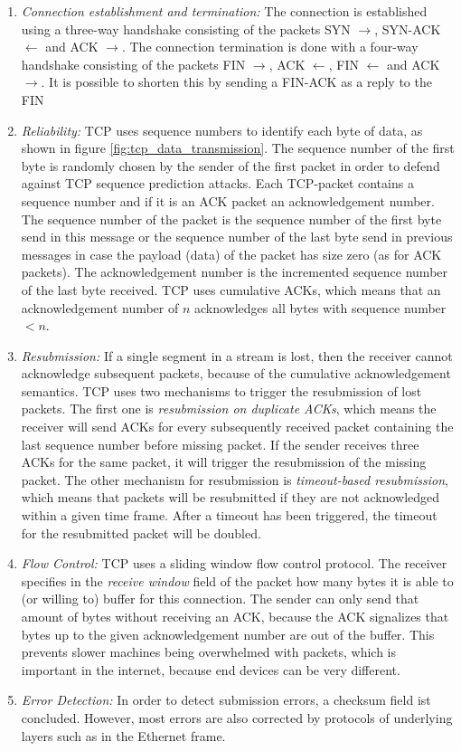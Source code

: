 \begin{enumerate}
      \item \textit{Connection establishment and termination:} The connection is established using a three-way handshake consisting of the packets SYN $\rightarrow$, SYN-ACK $\leftarrow$ and ACK $\rightarrow$. The connection termination is done with a four-way handshake consisting of the packets FIN $\rightarrow$, ACK $\leftarrow$, FIN $\leftarrow$ and ACK $\rightarrow$. It is possible to shorten this by sending a FIN-ACK as a reply to the FIN
      \item \textit{Reliability:} \ac{TCP} uses sequence numbers to identify each byte of data, as shown in figure \ref{fig:tcp_data_transmission}. The sequence number of the first byte is randomly chosen by the sender of the first packet in order to defend against TCP sequence prediction attacks. Each \ac{TCP}-packet contains a sequence number and \textendash{} if it is an ACK packet \textendash{} an acknowledgement number. The sequence number of the packet is the sequence number of the first byte send in this message or the sequence number of the last byte send in previous messages in case the payload (data) of the packet has size zero (as for ACK packets). The acknowledgement number is the incremented sequence number of the last byte received. TCP uses cumulative ACKs, which means that an acknowledgement number of $n$ acknowledges all bytes with sequence number $< n$.
      \item \textit{Resubmission:} If a single segment in a stream is lost, then the receiver cannot acknowledge subsequent packets, because of the cumulative acknowledgement semantics. TCP uses two mechanisms to trigger the resubmission of lost packets. The first one is \textit{resubmission on duplicate ACKs}, which means the receiver will send ACKs for every subsequently received packet containing the last sequence number before missing packet. If the sender receives three ACKs for the same packet, it will trigger the resubmission of the missing packet. The other mechanism for resubmission is \textit{timeout-based resubmission}, which means that packets will be resubmitted if they are not acknowledged within a given time frame. After a timeout has been triggered, the timeout for the resubmitted packet will be doubled.
      \item \textit{Flow Control:} \ac{TCP} uses a sliding window flow control protocol. The receiver specifies in the \textit{receive window} field of the packet how many bytes it is able to (or willing to) buffer for this connection. The sender can only send that amount of bytes without receiving an ACK, because the ACK signalizes that bytes up to the given acknowledgement number are out of the buffer. This prevents slower machines being overwhelmed with packets, which is important in the internet, because end devices can be very different.
      \item \textit{Error Detection:} In order to detect submission errors, a checksum field ist concluded. However, most errors are also corrected by protocols of underlying layers such as in the Ethernet frame.
\end{enumerate}


